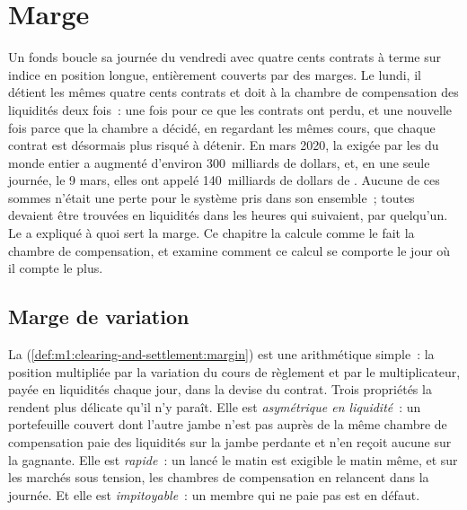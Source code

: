 \chapter{Marge}\label{ch:m1:margin}

Un fonds boucle sa journée du vendredi avec quatre cents contrats à terme sur indice en position longue, entièrement couverts par des marges.
Le lundi, il détient les mêmes quatre cents contrats et doit à la
chambre de compensation des liquidités deux fois~: une fois pour ce que les contrats ont perdu, et une nouvelle fois parce que
la chambre a décidé, en regardant les mêmes cours, que chaque contrat
est désormais plus risqué à détenir. En mars 2020, la 
exigée par les  du monde entier a augmenté d'environ 300~milliards de dollars,
et, en une seule journée, le 9 mars, elles ont appelé 140~milliards de dollars de .
Aucune de ces sommes n'était une perte pour le système pris dans son ensemble~; toutes devaient être
trouvées en liquidités dans les heures qui suivaient, par quelqu'un. Le 
a expliqué à quoi sert la marge. Ce chapitre la calcule comme le fait la
chambre de compensation, et examine comment ce calcul se comporte le jour où il compte le plus.

\section{Marge de variation}

La  (\cref{def:m1:clearing-and-settlement:margin}) est
une arithmétique simple~: la position multipliée par la variation du cours de règlement et par le
multiplicateur, payée en liquidités chaque jour, dans la devise du contrat. Trois
propriétés la rendent plus délicate qu'il n'y paraît. Elle est \emph{asymétrique en
liquidité}~: un portefeuille couvert dont l'autre jambe n'est pas auprès de la même
chambre de compensation paie des liquidités sur la jambe perdante et n'en reçoit aucune sur la gagnante. Elle est
\emph{rapide}~: un  lancé le matin est exigible le matin même, et sur les
marchés sous tension, les chambres de compensation en relancent dans la journée. Et elle est
\emph{impitoyable}~: un membre qui ne paie pas est en défaut.

